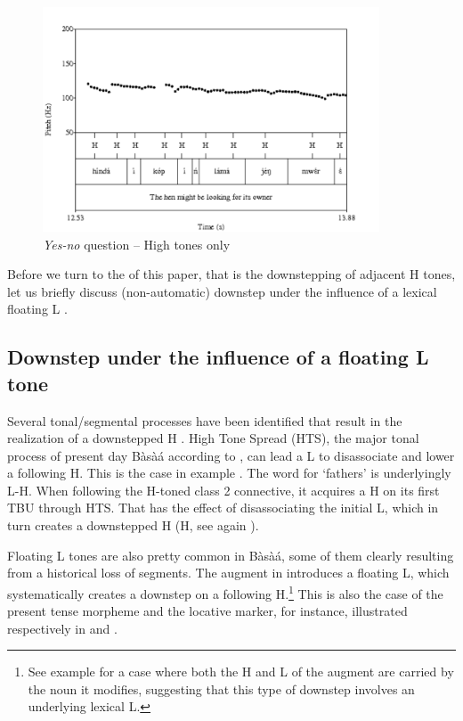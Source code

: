 \documentclass[output=paper,newtxmath,modfonts,nonflat,hidelinks]{langsci/langscibook}
\begin{document}
\begin{figure}
\centering
\includegraphics[width=10cm]{figures/HenManQNov}  
\caption{\emph{Yes-no} question -- High tones only \citep{MakassoEtAl17} \label{fig:HamlaouiMakasso:4}}
\end{figure}



\noindent Before we turn to the  of this paper, that is the downstepping of adjacent H tones, let us briefly discuss (non-automatic) downstep under the influence of a lexical floating L .

\subsection{Downstep under the influence of a floating L tone}

Several tonal/segmental processes have been identified that result in the realization of a downstepped H . High Tone Spread (HTS), the major tonal process of present day Bàsà{á} according to \citet{Hyman03}, can lead a L  to disassociate and lower a following H. This is the case in example . The word for `fathers' is underlyingly L-H. When following the H-toned class 2 connective, it acquires a H on its first TBU through HTS. That has the effect of disassociating the initial L, which in turn creates a downstepped H ({\↓}H, see again ).


Floating L tones are also pretty common in Bàsà{á}, some of them clearly resulting from a historical loss of segments. The augment in  introduces a floating L, which systematically creates a downstep on a following H.\footnote{See example  for a case where both the H and L  of the augment are carried by the noun it modifies, suggesting that this type of downstep involves an underlying lexical L.}  This is also the case of the present tense morpheme and the locative marker, for instance, illustrated respectively in  and .
\end{document}
